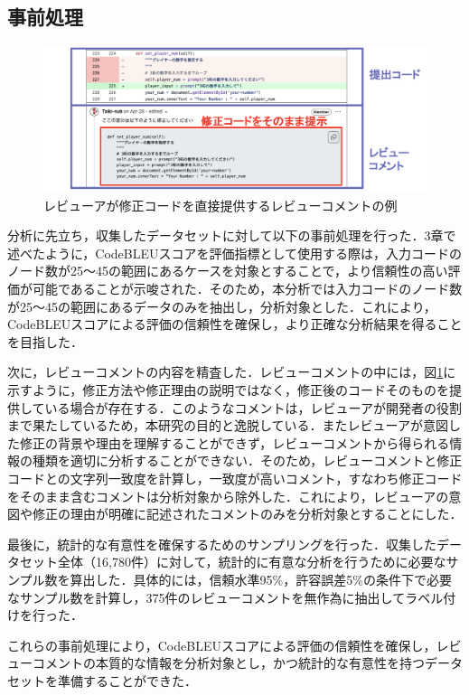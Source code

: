 \documentclass[11pt]{jreport}
\begin{document}
\subsection{事前処理}
\begin{figure}[htbp]
    \centering
    \includegraphics[width=0.8\linewidth]{@BSthesis2024_Akamatsu/Akamatsu_figs/review_comment.pdf}
    \caption{レビューアが修正コードを直接提供するレビューコメントの例}
    \label{fig:review-comment-example}
\end{figure}
分析に先立ち，収集したデータセットに対して以下の事前処理を行った．3章で述べたように，CodeBLEUスコアを評価指標として使用する際は，入力コードのノード数が25〜45の範囲にあるケースを対象とすることで，より信頼性の高い評価が可能であることが示唆された．そのため，本分析では入力コードのノード数が25〜45の範囲にあるデータのみを抽出し，分析対象とした．これにより，CodeBLEUスコアによる評価の信頼性を確保し，より正確な分析結果を得ることを目指した．

次に，レビューコメントの内容を精査した．レビューコメントの中には，図\ref{fig:review-comment-example}に示すように，修正方法や修正理由の説明ではなく，修正後のコードそのものを提供している場合が存在する．このようなコメントは，レビューアが開発者の役割まで果たしているため，本研究の目的と逸脱している．またレビューアが意図した修正の背景や理由を理解することができず，レビューコメントから得られる情報の種類を適切に分析することができない．そのため，レビューコメントと修正コードとの文字列一致度を計算し，一致度が高いコメント，すなわち修正コードをそのまま含むコメントは分析対象から除外した．これにより，レビューアの意図や修正の理由が明確に記述されたコメントのみを分析対象とすることにした．

最後に，統計的な有意性を確保するためのサンプリングを行った．収集したデータセット全体（16,780件）に対して，統計的に有意な分析を行うために必要なサンプル数を算出した．具体的には，信頼水準95\%，許容誤差5\%の条件下で必要なサンプル数を計算し，375件のレビューコメントを無作為に抽出してラベル付けを行った．

これらの事前処理により，CodeBLEUスコアによる評価の信頼性を確保し，レビューコメントの本質的な情報を分析対象とし，かつ統計的な有意性を持つデータセットを準備することができた．
\end{document}
